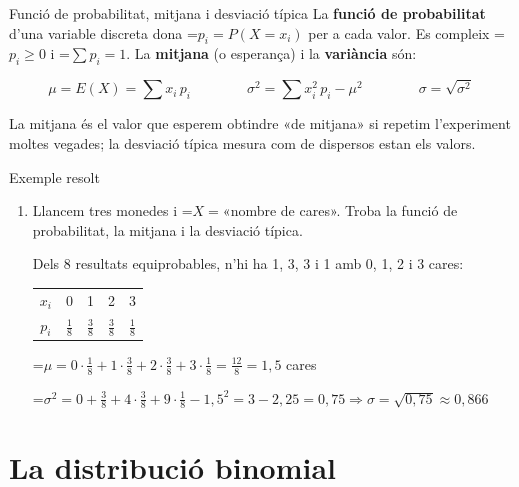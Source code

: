 \documentclass[11pt,a4paper]{article}
\newcommand{\fmm}[1]{\setbox0=\hbox{$#1$}\ifdim\wd0>\linewidth\[#1\]\else\mbox{\box0}\fi}
\begin{document}
  
\begin{fmdef}{Funció de probabilitat, mitjana i desviació típica}
La \textbf{funció de probabilitat} d'una variable discreta dona \fmm{p_i=P(X=x_i)} per a cada valor. Es compleix \fmm{p_i\geq0} i \fmm{\sum p_i=1}. La \textbf{mitjana} (o esperança) i la \textbf{variància} són:

      
\[\mu=E(X)=\sum x_i\,p_i\qquad\qquad\sigma^2=\sum x_i^2\,p_i-\mu^2\qquad\qquad\sigma=\sqrt{\sigma^2}\]

      

La mitjana és el valor que esperem obtindre «de mitjana» si repetim l'experiment moltes vegades; la desviació típica mesura com de dispersos estan els valors.
\end{fmdef}

  
\begin{fmex}{Exemple resolt}
\begin{enumerate}[label=\textbf{\arabic*.},leftmargin=*]
\item Llancem tres monedes i \fmm{X=}«nombre de cares». Troba la funció de probabilitat, la mitjana i la desviació típica.
          

            

Dels 8 resultats equiprobables, n'hi ha 1, 3, 3 i 1 amb 0, 1, 2 i 3 cares:

              
\begin{center}\renewcommand{\arraystretch}{1.5}\begin{tabular}{ccccc}\toprule
$x_i$ & 0 & 1 & 2 & 3\\
$p_i$ & $\frac18$ & $\frac38$ & $\frac38$ & $\frac18$\\
\bottomrule\end{tabular}\end{center}

            

\fmm{\mu=0\cdot\frac18+1\cdot\frac38+2\cdot\frac38+3\cdot\frac18=\frac{12}{8}=1{,}5} cares

            

\fmm{\sigma^2=0+\frac38+4\cdot\frac38+9\cdot\frac18-1{,}5^2=3-2{,}25=0{,}75\Rightarrow\sigma=\sqrt{0{,}75}\approx0{,}866}
\end{enumerate}
\end{fmex}

\section{La distribució binomial}\hypertarget{sec2}{}
\end{document}
